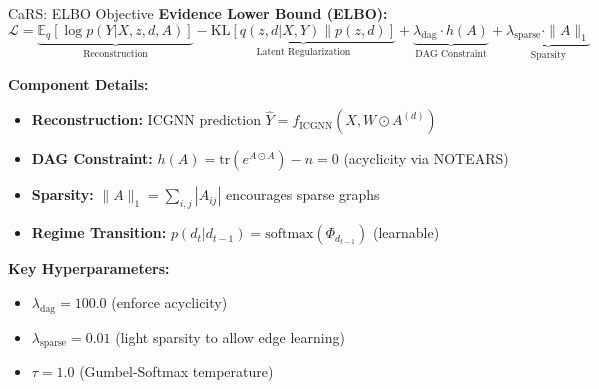 \documentclass[aspectratio=169]{beamer}
\begin{document}
\begin{frame}{CaRS: ELBO Objective}
\textbf{Evidence Lower Bound (ELBO):}
\begin{equation*}
\mathcal{L} = \underbrace{\mathbb{E}_{q}[\log p(Y|X,z,d,A)]}_{\text{Reconstruction}} - \underbrace{\text{KL}[q(z,d|X,Y) \| p(z,d)]}_{\text{Latent Regularization}} + \underbrace{\lambda_{\text{dag}} \cdot h(A)}_{\text{DAG Constraint}} + \underbrace{\lambda_{\text{sparse}} \cdot \|A\|_1}_{\text{Sparsity}}
\end{equation*}

\vspace{0.3cm}
\textbf{Component Details:}
\begin{itemize}
    \item \textbf{Reconstruction:} ICGNN prediction $\hat{Y} = f_{\text{ICGNN}}(X, W \odot A^{(d)})$
    \item \textbf{DAG Constraint:} $h(A) = \text{tr}(e^{A \odot A}) - n = 0$ (acyclicity via NOTEARS)
    \item \textbf{Sparsity:} $\|A\|_1 = \sum_{i,j} |A_{ij}|$ encourages sparse graphs
    \item \textbf{Regime Transition:} $p(d_t|d_{t-1}) = \text{softmax}(\Phi_{d_{t-1}})$ (learnable)
\end{itemize}

\vspace{0.3cm}
\textbf{Key Hyperparameters:}
\begin{itemize}
    \item $\lambda_{\text{dag}} = 100.0$ (enforce acyclicity)
    \item $\lambda_{\text{sparse}} = 0.01$ (light sparsity to allow edge learning)
    \item $\tau = 1.0$ (Gumbel-Softmax temperature)
\end{itemize}
\end{frame}
\end{document}
